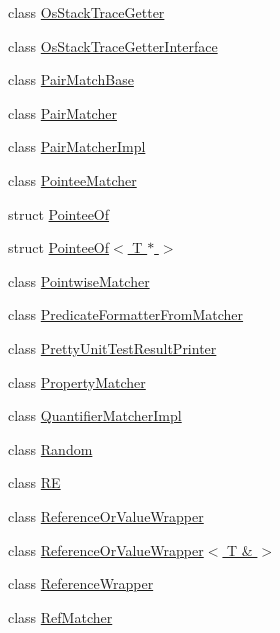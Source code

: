 \begin{DoxyCompactItemize}
\item 
class \hyperlink{classtesting_1_1internal_1_1_os_stack_trace_getter}{Os\+Stack\+Trace\+Getter}
\item 
class \hyperlink{classtesting_1_1internal_1_1_os_stack_trace_getter_interface}{Os\+Stack\+Trace\+Getter\+Interface}
\item 
class \hyperlink{classtesting_1_1internal_1_1_pair_match_base}{Pair\+Match\+Base}
\item 
class \hyperlink{classtesting_1_1internal_1_1_pair_matcher}{Pair\+Matcher}
\item 
class \hyperlink{classtesting_1_1internal_1_1_pair_matcher_impl}{Pair\+Matcher\+Impl}
\item 
class \hyperlink{classtesting_1_1internal_1_1_pointee_matcher}{Pointee\+Matcher}
\item 
struct \hyperlink{structtesting_1_1internal_1_1_pointee_of}{Pointee\+Of}
\item 
struct \hyperlink{structtesting_1_1internal_1_1_pointee_of_3_01_t_01_5_01_4}{Pointee\+Of$<$ T $\ast$ $>$}
\item 
class \hyperlink{classtesting_1_1internal_1_1_pointwise_matcher}{Pointwise\+Matcher}
\item 
class \hyperlink{classtesting_1_1internal_1_1_predicate_formatter_from_matcher}{Predicate\+Formatter\+From\+Matcher}
\item 
class \hyperlink{classtesting_1_1internal_1_1_pretty_unit_test_result_printer}{Pretty\+Unit\+Test\+Result\+Printer}
\item 
class \hyperlink{classtesting_1_1internal_1_1_property_matcher}{Property\+Matcher}
\item 
class \hyperlink{classtesting_1_1internal_1_1_quantifier_matcher_impl}{Quantifier\+Matcher\+Impl}
\item 
class \hyperlink{classtesting_1_1internal_1_1_random}{Random}
\item 
class \hyperlink{classtesting_1_1internal_1_1_r_e}{RE}
\item 
class \hyperlink{classtesting_1_1internal_1_1_reference_or_value_wrapper}{Reference\+Or\+Value\+Wrapper}
\item 
class \hyperlink{classtesting_1_1internal_1_1_reference_or_value_wrapper_3_01_t_01_6_01_4}{Reference\+Or\+Value\+Wrapper$<$ T \& $>$}
\item 
class \hyperlink{classtesting_1_1internal_1_1_reference_wrapper}{Reference\+Wrapper}
\item 
class \hyperlink{classtesting_1_1internal_1_1_ref_matcher}{Ref\+Matcher}

\end{DoxyCompactItemize}
